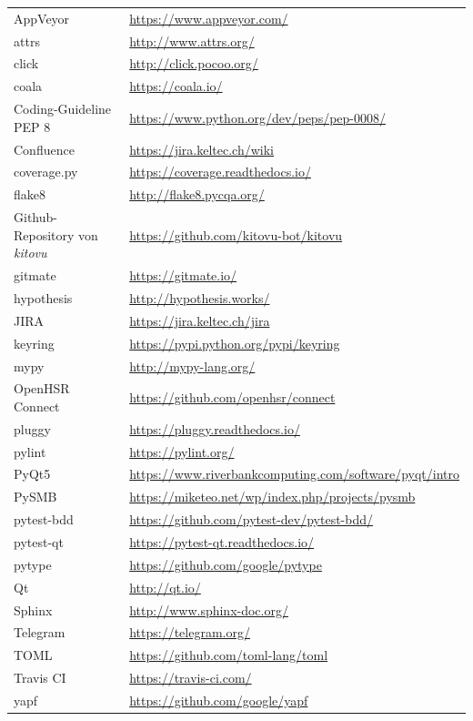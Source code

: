 \documentclass[a4paper]{article}
\def\jiraurl{https://jira.keltec.ch/jira}
\def\confluenceurl{https://jira.keltec.ch/wiki}
\begin{document}
\begin{tabulary}{\linewidth}{ll}
  AppVeyor & \url{https://www.appveyor.com/} \\
  attrs & \url{http://www.attrs.org/} \\ 
  click & \url{http://click.pocoo.org/} \\ 
  coala & \url{https://coala.io/} \\
  Coding-Guideline PEP 8 & \url{https://www.python.org/dev/peps/pep-0008/} \\
  Confluence & \url{\confluenceurl} \\
  coverage.py & \url{https://coverage.readthedocs.io/} \\
  flake8 & \url{http://flake8.pycqa.org/} \\
  Github-Repository von \emph{kitovu} & \url{https://github.com/kitovu-bot/kitovu} \\
  gitmate & \url{https://gitmate.io/} \\
  hypothesis & \url{http://hypothesis.works/} \\
  JIRA	& \url{\jiraurl} \\
  keyring & \url{https://pypi.python.org/pypi/keyring} \\ 
  mypy & \url{http://mypy-lang.org/} \\
  OpenHSR Connect & \url{https://github.com/openhsr/connect} \\
  pluggy & \url{https://pluggy.readthedocs.io/} \\ 
  pylint & \url{https://pylint.org/} \\
  PyQt5 & \url{https://www.riverbankcomputing.com/software/pyqt/intro} \\ 
  PySMB & \url{https://miketeo.net/wp/index.php/projects/pysmb} \\ 
  pytest-bdd & \url{https://github.com/pytest-dev/pytest-bdd/} \\
  pytest-qt & \url{https://pytest-qt.readthedocs.io/} \\
  pytype & \url{https://github.com/google/pytype} \\ 
  Qt & \url{http://qt.io/} \\ 
  Sphinx & \url{http://www.sphinx-doc.org/} \\
  Telegram & \url{https://telegram.org/} \\
  TOML & \url{https://github.com/toml-lang/toml} \\ 
  Travis CI & \url{https://travis-ci.com/} \\
  yapf & \url{https://github.com/google/yapf} \\
\end{tabulary}
\end{document}
